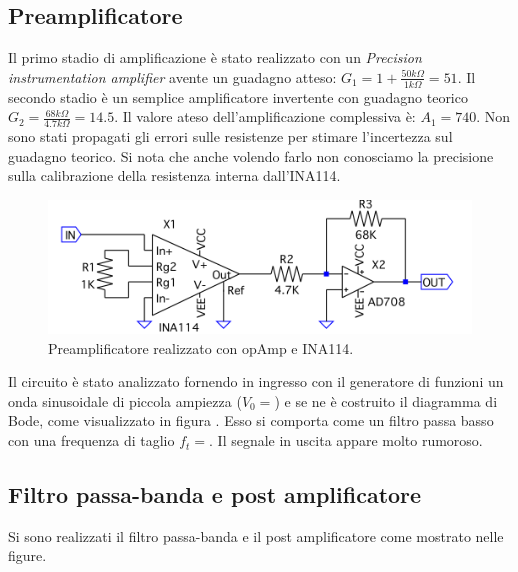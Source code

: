 \documentclass[10pt,a4paper]{article}
\begin{document}
\subsection{Preamplificatore}
Il primo stadio di amplificazione è stato realizzato con un \emph{Precision instrumentation amplifier} avente un guadagno atteso: $G_1 = 1+\frac{50 k\Omega}{1 k\Omega} = 51$. Il secondo stadio è un semplice amplificatore invertente con guadagno teorico $G_2 = \frac{68 k\Omega}{4.7 k\Omega} = 14.5$. Il valore ateso dell'amplificazione complessiva è: $A_1 = 740$.
Non sono stati propagati gli errori sulle resistenze per stimare l'incertezza sul guadagno teorico. Si nota che anche volendo farlo non conosciamo la precisione sulla calibrazione della resistenza interna dall'INA114.\\

\begin{figure}[!htb]
\centering
\includegraphics[scale=0.5]{preamp.png}
\caption{Preamplificatore realizzato con opAmp e INA114.\label{preamp}}
\end{figure}

Il circuito è stato analizzato fornendo in ingresso con il generatore di funzioni un onda sinusoidale di piccola ampiezza ($V_0 = $) e se ne è costruito il diagramma di Bode, come visualizzato in figura . Esso si comporta come un filtro passa basso con una frequenza di taglio $f_t = $. Il segnale in uscita appare molto rumoroso.\\


\subsection{Filtro passa-banda e post amplificatore}
Si sono realizzati il filtro passa-banda e il post amplificatore come mostrato nelle figure.
\end{document}

